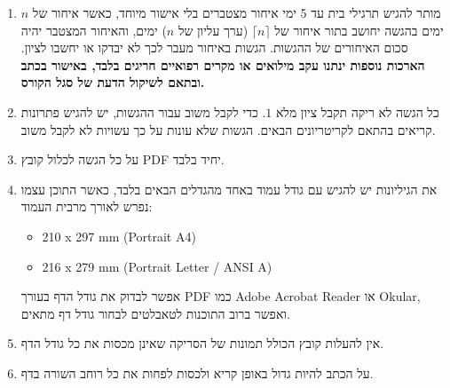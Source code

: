 \documentclass{article}
\begin{document}
\begin{enumerate}
\item מותר להגיש תרגילי בית עד 5 ימי איחור מצטברים בלי אישור מיוחד, כאשר איחור של $n$ ימים בהגשה יחושב בתור איחור של
$\lceil n \rceil$
(ערך עליון של
$n$)
ימים, והאיחור המצטבר יהיה סכום האיחורים של ההגשות. הגשות באיחור מעבר לכך לא יבדקו או יחשבו לציון.
\textbf{
הארכות נוספות ינתנו עקב מילואים או מקרים רפואיים חריגים בלבד, באישור בכתב ובתאם לשיקול הדעת של סגל הקורס.
}
\item כל הגשה לא ריקה תקבל ציון מלא
$1$.
כדי לקבל משוב עבור ההגשות, יש להגיש פתרונות קריאים בהתאם לקריטריונים הבאים. הגשות שלא עונות על כך עשויות לא לקבל משוב.
\item על כל הגשה לכלול קובץ
\textenglish{PDF}
יחיד בלבד.
\item את הגיליונות יש להגיש עם גודל עמוד באחד מהגדלים הבאים בלבד, כאשר התוכן עצמו נפרש לאורך מרבית העמוד:
\begin{english}
\begin{itemize}
\item 210 x 297 mm (Portrait A4)
\item 216 x 279 mm (Portrait Letter / ANSI A)
\end{itemize}
\end{english}
אפשר לבדוק את גודל הדף בעורך
\textenglish{PDF}
כמו
\textenglish{Adobe Acrobat Reader}
או
\textenglish{Okular},
ואפשר ברוב התוכנות לטאבלטים לבחור גודל דף מתאים.

\item אין להעלות קובץ הכולל תמונות של הסריקה שאינן מכסות את כל גודל הדף.

\item על הכתב להיות גדול באופן קריא ולכסות לפחות את כל רוחב השורה בדף.
\end{enumerate}
\end{document}

